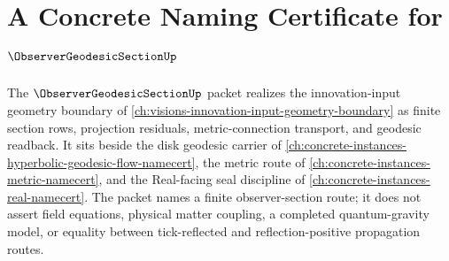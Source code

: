 \chapter{A Concrete Naming Certificate for $\ObserverGeodesicSectionUp$}
\label{ch:concrete-instances-observer-geodesic-section-namecert}

The $\ObserverGeodesicSectionUp$ packet realizes the innovation-input geometry boundary of \autoref{ch:visions-innovation-input-geometry-boundary} as finite section rows, projection residuals, metric-connection transport, and geodesic readback. It sits beside the disk geodesic carrier of \autoref{ch:concrete-instances-hyperbolic-geodesic-flow-namecert}, the metric route of \autoref{ch:concrete-instances-metric-namecert}, and the Real-facing seal discipline of \autoref{ch:concrete-instances-real-namecert}. The packet names a finite observer-section route; it does not assert field equations, physical matter coupling, a completed quantum-gravity model, or equality between tick-reflected and reflection-positive propagation routes.

